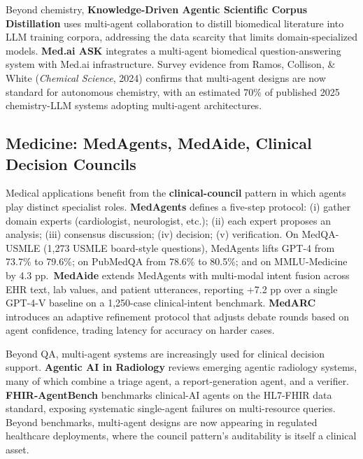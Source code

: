\documentclass{article}
\begin{document}
Beyond chemistry, \textbf{Knowledge-Driven Agentic Scientific Corpus Distillation} \citep{xiao20252025} uses multi-agent collaboration to distill biomedical literature into LLM training corpora, addressing the data scarcity that limits domain-specialized models. \textbf{Med.ai ASK} \citep{nguyen20262026} integrates a multi-agent biomedical question-answering system with Med.ai infrastructure. Survey evidence from Ramos, Collison, \& White (\emph{Chemical Science}, 2024) confirms that multi-agent designs are now standard for autonomous chemistry, with an estimated 70\% of published 2025 chemistry-LLM systems adopting multi-agent architectures.

\subsection{Medicine: MedAgents, MedAide, Clinical Decision Councils}\label{medicine-medagents-medaide-clinical-decision-councils}

Medical applications benefit from the \textbf{clinical-council} pattern in which agents play distinct specialist roles. \textbf{MedAgents} \citep{tang2024medagentslargelang} defines a five-step protocol: (i) gather domain experts (cardiologist, neurologist, etc.); (ii) each expert proposes an analysis; (iii) consensus discussion; (iv) decision; (v) verification. On MedQA-USMLE (1,273 USMLE board-style questions), MedAgents lifts GPT-4 from 73.7\% to 79.6\%; on PubMedQA from 78.6\% to 80.5\%; and on MMLU-Medicine by 4.3 pp.~\textbf{MedAide} \citep{yang20242024} extends MedAgents with multi-modal intent fusion across EHR text, lab values, and patient utterances, reporting +7.2 pp over a single GPT-4-V baseline on a 1,250-case clinical-intent benchmark. \textbf{MedARC} \citep{miao20252026} introduces an adaptive refinement protocol that adjusts debate rounds based on agent confidence, trading latency for accuracy on harder cases.

Beyond QA, multi-agent systems are increasingly used for clinical decision support. \textbf{Agentic AI in Radiology} \citep{khosravi20262026} reviews emerging agentic radiology systems, many of which combine a triage agent, a report-generation agent, and a verifier. \textbf{FHIR-AgentBench} \citep{lee20252025} benchmarks clinical-AI agents on the HL7-FHIR data standard, exposing systematic single-agent failures on multi-resource queries. Beyond benchmarks, multi-agent designs are now appearing in regulated healthcare deployments, where the council pattern's auditability is itself a clinical asset.
\end{document}
